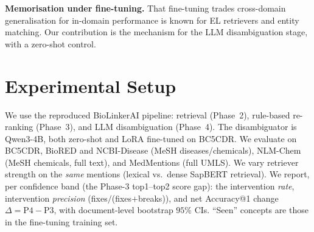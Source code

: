 \documentclass[11pt]{article}
\begin{document}
\textbf{Memorisation under fine-tuning.} That fine-tuning trades cross-domain
generalisation for in-domain performance is known for EL retrievers
\citep{logeswaran2019} and entity matching. Our contribution is the mechanism for the
LLM disambiguation stage, with a zero-shot control.

\section{Experimental Setup}
We use the reproduced BioLinkerAI pipeline: retrieval (Phase~2), rule-based re-ranking
(Phase~3), and LLM disambiguation (Phase~4). The disambiguator is Qwen3-4B, both
zero-shot and LoRA fine-tuned on BC5CDR. We evaluate on BC5CDR, BioRED and NCBI-Disease
(MeSH diseases/chemicals), NLM-Chem (MeSH chemicals, full text), and MedMentions (full
UMLS). We vary retriever strength on the \emph{same} mentions (lexical vs.\ dense
SapBERT retrieval). We report, per confidence band (the Phase-3 top1--top2 score gap):
the intervention \emph{rate}, intervention \emph{precision} (fixes$/$(fixes$+$breaks)),
and net Accuracy@1 change $\Delta = \text{P4}-\text{P3}$, with document-level bootstrap
$95\%$ CIs. ``Seen'' concepts are those in the fine-tuning training set.
\end{document}
